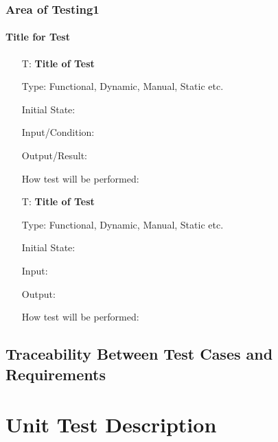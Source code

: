 \documentclass[12pt, titlepage]{article}
\newcounter{testnum} %
\begin{document}


\subsubsection{Area of Testing1}

\paragraph{Title for Test}

\begin{enumerate}

  \item[T\refstepcounter{testnum}\thetestnum \label{test_label}:]
    \textbf{Title of Test}

    Type: Functional, Dynamic, Manual, Static etc.

    Initial State:

    Input/Condition:

    Output/Result:

    How test will be performed:

  \item[T\refstepcounter{testnum}\thetestnum \label{test_label2}:]
    \textbf{Title of Test}

    Type: Functional, Dynamic, Manual, Static etc.

    Initial State:

    Input:

    Output:

    How test will be performed:

\end{enumerate}

\subsection{Traceability Between Test Cases and Requirements}


\section{Unit Test Description}
\end{document}
